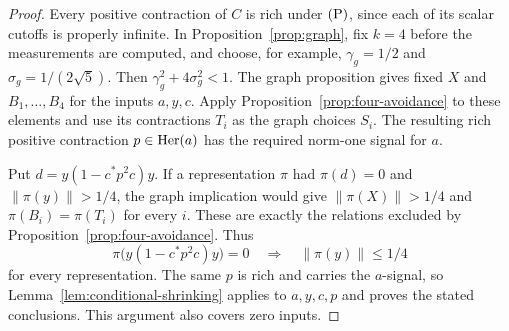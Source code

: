 \begin{proof}
Every positive contraction of \(C\) is rich under \(\textup{(P)}\), since
each of its scalar cutoffs is properly infinite.  In
Proposition~\ref{prop:graph}, fix \(k=4\) before the measurements
are computed, and choose, for example,
\(\gamma_g=1/2\) and \(\sigma_g=1/(2\sqrt5)\).  Then
\(\gamma_g^2+4\sigma_g^2<1\).  The graph proposition gives fixed
\(X\) and \(B_1,\ldots,B_4\) for the inputs \(a,y,c\).
Apply Proposition~\ref{prop:four-avoidance} to these elements and
use its contractions \(T_i\) as the graph choices \(S_i\).
The resulting rich positive contraction \(p\in\operatorname{Her}(a)\) has the
required norm-one signal for \(a\).

Put \(d=y(1-c^*p^2c)y\).  If a representation \(\pi\) had
\(\pi(d)=0\) and \(\|\pi(y)\|>1/4\), the graph implication would
give \(\|\pi(X)\|>1/4\) and \(\pi(B_i)=\pi(T_i)\) for every
\(i\).  These are exactly the relations excluded by
Proposition~\ref{prop:four-avoidance}.  Thus
\begin{equation}\label{eq:nonvanishing-P}
 \pi\bigl(y(1-c^*p^2c)y\bigr)=0
 \quad\Longrightarrow\quad \|\pi(y)\|\le1/4
\end{equation}
for every representation.  The same \(p\) is rich and carries the
\(a\)-signal, so Lemma~\ref{lem:conditional-shrinking} applies to
\(a,y,c,p\) and proves the stated conclusions.  This argument also
covers zero inputs.
\end{proof}
